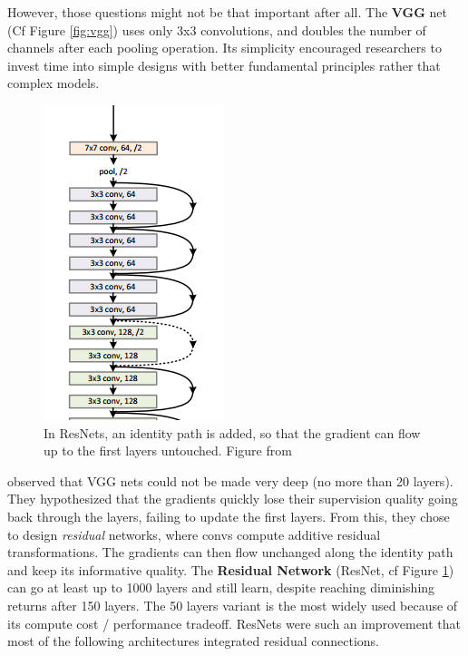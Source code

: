 However, those questions might not be that important after all. The \textbf{VGG} net  \citep{vgg} (Cf Figure \ref{fig:vgg}) uses only 3x3 convolutions, and doubles the number of channels after each pooling operation. Its simplicity encouraged researchers to invest time into simple designs with better fundamental principles rather that complex models.

\begin{figure}[t]
    \centering
    \includegraphics{30-activity/resnet.png}
    \caption{In ResNets, an identity path is added, so that the gradient can flow up to the first layers untouched. Figure from \cite{resnet}}
    \label{fig:resnet}
\end{figure}

\citet{resnet} observed that VGG nets could not be made very deep (no more than 20 layers). They hypothesized that the gradients quickly lose their supervision quality going back through the layers, failing to update the first layers. From this, they chose to design \emph{residual} networks, where convs compute additive residual transformations. The gradients can then flow unchanged along the identity path and keep its informative quality. The \textbf{Residual Network} (ResNet, cf Figure \ref{fig:resnet}) can go at least up to 1000 layers and still learn, despite reaching diminishing returns after 150 layers. The 50 layers variant is the most widely used because of its compute cost / performance tradeoff. ResNets were such an improvement that most of the following architectures integrated residual connections.

